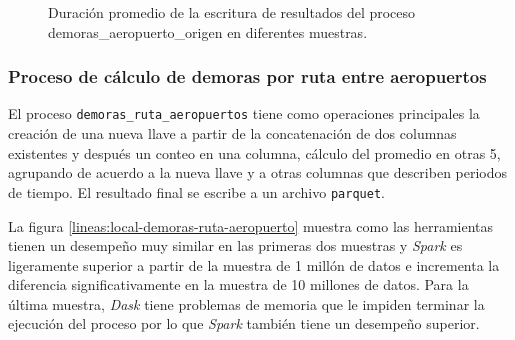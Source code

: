 \begin{figure}
\centering
{}
\caption{Duración promedio de la escritura de resultados del proceso demoras\_aeropuerto\_origen en diferentes muestras.}
\label{lineas:local-demoras-aeropuerto-origen-write}
\end{figure}

\subsubsection{Proceso de cálculo de demoras por ruta entre aeropuertos}

El proceso \texttt{demoras\_ruta\_aeropuertos} tiene como operaciones principales  la creación de una nueva llave a partir de la concatenación de dos columnas existentes y después un conteo en una columna, cálculo del promedio en otras 5, agrupando de acuerdo a la nueva llave y a otras columnas que describen periodos de tiempo. El resultado final se escribe a un archivo \texttt{parquet}.

La figura \ref{lineas:local-demoras-ruta-aeropuerto} muestra como las herramientas tienen un desempeño muy similar en las primeras dos muestras y \textit{Spark} es ligeramente superior a partir de la muestra de 1 millón de datos e incrementa la diferencia significativamente en la muestra de 10 millones de datos. Para la última muestra, \textit{Dask} tiene problemas de memoria que le impiden terminar la ejecución del proceso por lo que \textit{Spark} también tiene un desempeño superior. 


